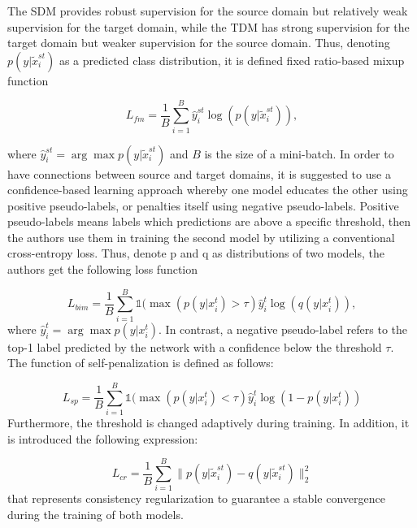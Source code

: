 The SDM provides robust supervision for the source domain but relatively weak supervision for the target domain, while the TDM has strong supervision for the target domain but weaker supervision for the source domain. Thus, denoting $p(y| \tilde{x}^{st}_i)$ as a predicted class distribution, it is defined fixed ratio-based mixup function 

$$
L_{fm} = \dfrac{1}{B} \sum_{i = 1}^B \hat{y}^{st}_i \log (p(y|\tilde{x}^{st}_i)),
$$

where $\hat{y}^{st}_i = \arg \max p(y|\tilde{x}^{st}_i)$ and $B$ is the size of a mini-batch. In order to have connections between source and target domains, it is suggested to use a confidence-based learning approach whereby one model educates the other using positive pseudo-labels, or penalties itself using negative pseudo-labels. Positive pseudo-labels means labels which predictions are above a specific threshold, then the authors use them in training the second model by utilizing a conventional cross-entropy loss. Thus, denote p and q as distributions of two models, the authors get the following loss function

$$
L_{bim} = \dfrac{1}{B}\sum_{i=1}^B \mathds{1}(\max (p(y|x_i^t) > \tau)\hat{y}_i^t \log (q(y|x_i^t)),
$$
where $\hat{y}_i^t = \arg \max p(y|x_i^t)$. In contrast, a negative pseudo-label refers to the top-1 label predicted by the network with a confidence below the threshold $\tau$. The function of self-penalization is defined as follows:

$$
L_{sp} = \dfrac{1}{B}\sum_{i=1}^B \mathds{1}(\max (p(y|x_i^t) < \tau)\hat{y}_i^t \log (1 - p(y|x_i^t))
$$
Furthermore, the threshold is changed adaptively during training. In addition, it is introduced the following expression: 

$$
L_{cr} = \dfrac{1}{B} \sum_{i=1}^B \| p(y|\tilde{x}^{st}_i) - q(y|\tilde{x}^{st}_i)\|^2_2
$$
that represents consistency regularization to guarantee a stable convergence during the training of both models.
